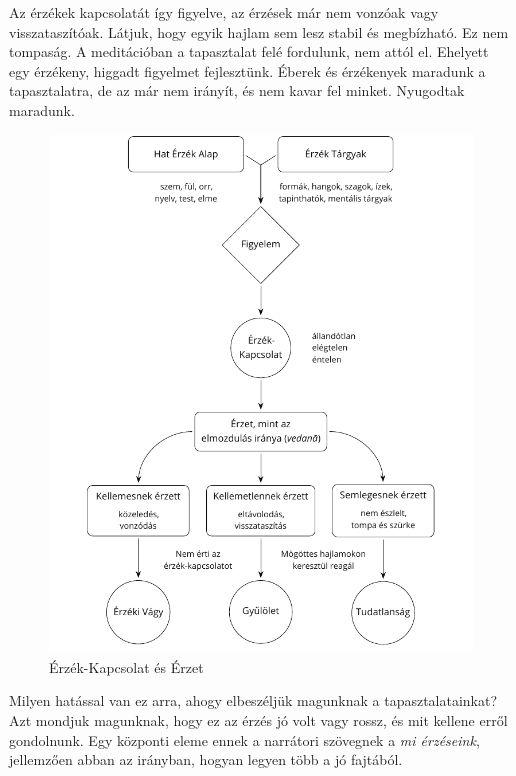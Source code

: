 Az érzékek kapcsolatát így figyelve, az érzések már nem vonzóak vagy
visszataszítóak. Látjuk, hogy egyik hajlam sem lesz stabil és
megbízható. Ez nem tompaság. A meditációban a tapasztalat felé
fordulunk, nem attól el. Ehelyett egy érzékeny, higgadt figyelmet
fejlesztünk. Éberek és érzékenyek maradunk a tapasztalatra, de az már
nem irányít, és nem kavar fel minket. Nyugodtak maradunk.

\clearpage
\figurepagelayout

\begin{figure}[h]
\caption{Érzék-Kapcsolat és Érzet}\label{fig-sense-contact-feeling}
\bigskip
\includegraphics[width=\linewidth]{./manuscript/tex/diagrams/sense-contact-feeling-hu.pdf}
\end{figure}

\clearpage
\normalpagelayout

\vspace*{-\baselineskip}


Milyen hatással van ez arra, ahogy elbeszéljük magunknak a
tapasztalatainkat? Azt mondjuk magunknak, hogy ez az érzés jó volt vagy
rossz, és mit kellene erről gondolnunk. Egy központi eleme ennek a
narrátori szövegnek a \emph{mi érzéseink}, jellemzően abban az irányban,
hogyan legyen több a jó fajtából.

